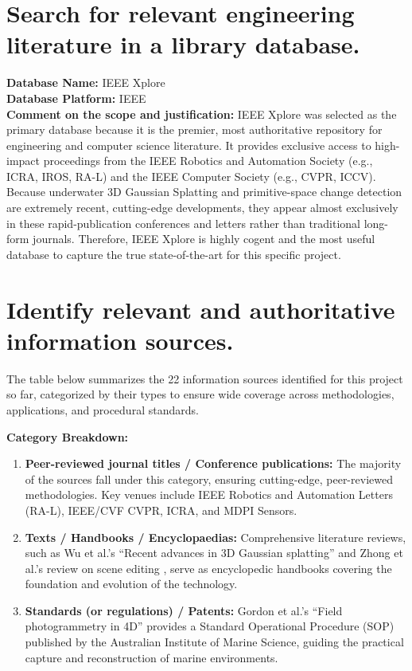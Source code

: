 \documentclass[12pt, a4paper]{article}
\begin{document}
\section*{Search for relevant engineering literature in a library database.}

\textbf{Database Name:} IEEE Xplore \\
\textbf{Database Platform:} IEEE \\

\textbf{Comment on the scope and justification:} IEEE Xplore was selected as the primary database because it is the premier, most authoritative repository for engineering and computer science literature. It provides exclusive access to high-impact proceedings from the IEEE Robotics and Automation Society (e.g., ICRA, IROS, RA-L) and the IEEE Computer Society (e.g., CVPR, ICCV). Because underwater 3D Gaussian Splatting and primitive-space change detection are extremely recent, cutting-edge developments, they appear almost exclusively in these rapid-publication conferences and letters rather than traditional long-form journals. Therefore, IEEE Xplore is highly cogent and the most useful database to capture the true state-of-the-art for this specific project.




\section*{Identify relevant and authoritative information sources.}
The table below summarizes the 22 information sources identified for this project so far, categorized by their types to ensure wide coverage across methodologies, applications, and procedural standards.

\vspace{0.3cm}
\noindent\textbf{Category Breakdown:}
\begin{enumerate}[label=\alph*.]
    \item \textbf{Peer-reviewed journal titles / Conference publications:} The majority of the sources fall under this category, ensuring cutting-edge, peer-reviewed methodologies. Key venues include IEEE Robotics and Automation Letters (RA-L), IEEE/CVF CVPR, ICRA, and MDPI Sensors.
    \item \textbf{Texts / Handbooks / Encyclopaedias:} Comprehensive literature reviews, such as Wu et al.'s ``Recent advances in 3D Gaussian splatting'' \cite{10897713} and Zhong et al.'s review on scene editing \cite{10.1145/3806262.3806264}, serve as encyclopedic handbooks covering the foundation and evolution of the technology.
    \item \textbf{Standards (or regulations) / Patents:} Gordon et al.'s ``Field photogrammetry in 4D'' \cite{gordon2023field} provides a Standard Operational Procedure (SOP) published by the Australian Institute of Marine Science, guiding the practical capture and reconstruction of marine environments.
\end{enumerate}
\end{document}
